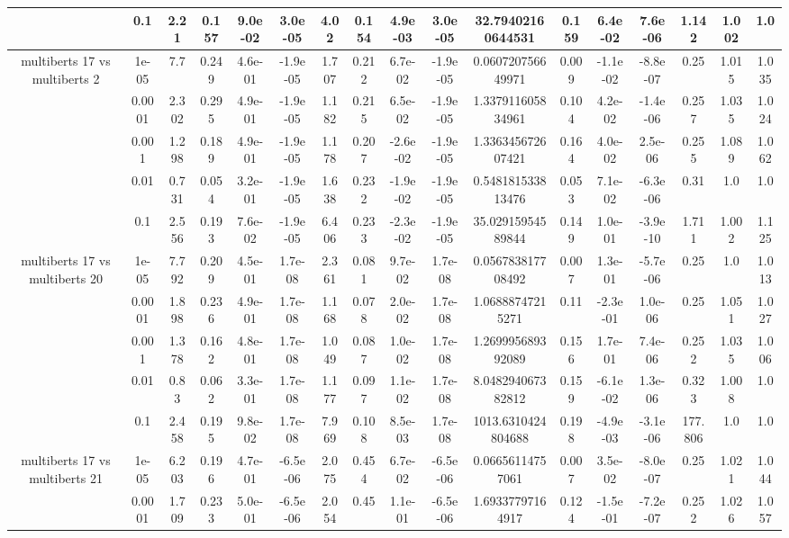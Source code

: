 \begin{tabular}{|c|c|c|c|c|c|c|c|c|c|c|c|c|c|c|c|c|}
 & 0.1 & 2.21 & 0.157 & 9.0e-02 & 3.0e-05 & 4.02 & 0.154 & 4.9e-03 & 3.0e-05 & 32.79402160644531 & 0.159 & 6.4e-02 & 7.6e-06 & 1.142 & 1.002 & 1.0 \\
\hline
\multirow{5}{*}{multiberts 17 vs multiberts 2} & 1e-05 & 7.7 & 0.249 & 4.6e-01 & -1.9e-05 & 1.707 & 0.212 & 6.7e-02 & -1.9e-05 & 0.060720756649971 & 0.009 & -1.1e-02 & -8.8e-07 & 0.25 & 1.015 & 1.035 \\
 & 0.0001 & 2.302 & 0.295 & 4.9e-01 & -1.9e-05 & 1.182 & 0.215 & 6.5e-02 & -1.9e-05 & 1.337911605834961 & 0.104 & 4.2e-02 & -1.4e-06 & 0.257 & 1.035 & 1.024 \\
 & 0.001 & 1.298 & 0.189 & 4.9e-01 & -1.9e-05 & 1.178 & 0.207 & -2.6e-02 & -1.9e-05 & 1.336345672607421 & 0.164 & 4.0e-02 & 2.5e-06 & 0.255 & 1.089 & 1.062 \\
 & 0.01 & 0.731 & 0.054 & 3.2e-01 & -1.9e-05 & 1.638 & 0.232 & -1.9e-02 & -1.9e-05 & 0.548181533813476 & 0.053 & 7.1e-02 & -6.3e-06 & 0.31 & 1.0 & 1.0 \\
 & 0.1 & 2.556 & 0.193 & 7.6e-02 & -1.9e-05 & 6.406 & 0.233 & -2.3e-02 & -1.9e-05 & 35.02915954589844 & 0.149 & 1.0e-01 & -3.9e-10 & 1.711 & 1.002 & 1.125 \\
\hline
\multirow{5}{*}{multiberts 17 vs multiberts 20} & 1e-05 & 7.792 & 0.209 & 4.5e-01 & 1.7e-08 & 2.361 & 0.081 & 9.7e-02 & 1.7e-08 & 0.056783817708492 & 0.007 & 1.3e-01 & -5.7e-06 & 0.25 & 1.0 & 1.013 \\
 & 0.0001 & 1.898 & 0.236 & 4.9e-01 & 1.7e-08 & 1.168 & 0.078 & 2.0e-02 & 1.7e-08 & 1.06888747215271 & 0.11 & -2.3e-01 & 1.0e-06 & 0.25 & 1.051 & 1.027 \\
 & 0.001 & 1.378 & 0.162 & 4.8e-01 & 1.7e-08 & 1.049 & 0.087 & 1.0e-02 & 1.7e-08 & 1.269995689392089 & 0.156 & 1.7e-01 & 7.4e-06 & 0.252 & 1.035 & 1.006 \\
 & 0.01 & 0.83 & 0.062 & 3.3e-01 & 1.7e-08 & 1.177 & 0.097 & 1.1e-02 & 1.7e-08 & 8.048294067382812 & 0.159 & -6.1e-02 & 1.3e-06 & 0.323 & 1.008 & 1.0 \\
 & 0.1 & 2.458 & 0.195 & 9.8e-02 & 1.7e-08 & 7.969 & 0.108 & 8.5e-03 & 1.7e-08 & 1013.6310424804688 & 0.198 & -4.9e-03 & -3.1e-06 & 177.806 & 1.0 & 1.0 \\
\hline
\multirow{5}{*}{multiberts 17 vs multiberts 21} & 1e-05 & 6.203 & 0.196 & 4.7e-01 & -6.5e-06 & 2.075 & 0.454 & 6.7e-02 & -6.5e-06 & 0.06656114757061 & 0.007 & 3.5e-02 & -8.0e-07 & 0.25 & 1.021 & 1.044 \\
 & 0.0001 & 1.709 & 0.233 & 5.0e-01 & -6.5e-06 & 2.054 & 0.45 & 1.1e-01 & -6.5e-06 & 1.69337797164917 & 0.124 & -1.5e-01 & -7.2e-07 & 0.252 & 1.026 & 1.057 \\

\end{tabular}

